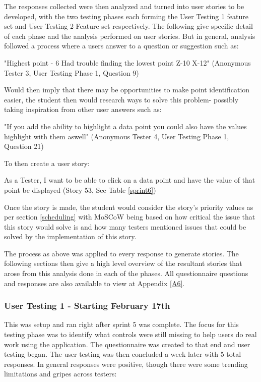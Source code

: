 The responses collected were then analyzed and turned into user stories to be developed, with the two testing phases each forming the User Testing 1 feature set and User Testing 2 Feature set respectively. The following give specific detail of each phase and the analysis performed on user stories. But in general, analysis followed a process where a users answer to a question or suggestion such as:

\begin{displayquote}
    "Highest point - 6 Had trouble finding the lowest point Z-10 X-12" (Anonymous Tester 3, User Testing Phase 1, Question 9)
\end{displayquote}

Would then imply that there may be opportunities to make point identification easier, the student then would research ways to solve this problem- possibly taking inspiration from other user answers such as:

\begin{displayquote}
    "If you add the ability to highlight a data point you could also have the values highlight with them aswell" (Anonymous Tester 4, User Testing Phase 1, Question 21)
\end{displayquote}

To then create a user story:

\begin{displayquote}
    As a Tester, I want to be able to
    click on a data point and have
    the value of that point be displayed (Story 53, See Table \ref{sprint6})
\end{displayquote}

Once the story is made, the student would consider the story's priority values as per section \ref{scheduling} with MoSCoW being based on how critical the issue that this story would solve is and how many testers mentioned issues that could be solved by the implementation of this story.

The process as above was applied to every response to generate stories. The following sections then give a high level overview of the resultant stories that arose from this analysis done in each of the phases. All questionnaire questions and responses are also available to view at Appendix \ref{A6}.

\subsubsection{User Testing 1 - Starting February 17th} \label{usertestanalysis}
This was setup and ran right after sprint 5 was complete. The focus for this testing phase was to identify what controls were still missing to help users do real work using the application. The questionnaire was created to that end and user testing began. The user testing was then concluded a week later with 5 total responses. In general responses were positive, though there were some trending limitations and gripes across testers:


